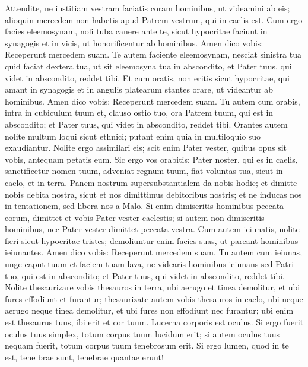 \begin{biblechapter}
\begin{biblechapter}
\begin{biblechapter}
\begin{biblechapter}
\begin{biblechapter}
\begin{biblechapter}
\verse Attendite, ne iustitiam vestram faciatis coram hominibus, ut videamini ab eis; alioquin mercedem non habetis apud Patrem vestrum, qui in caelis est. 
 \verse Cum ergo facies eleemosynam, noli tuba canere ante te, sicut hypocritae faciunt in synagogis et in vicis, ut honorificentur ab hominibus. Amen dico vobis: Receperunt mercedem suam.
 \verse Te autem faciente eleemosynam, nesciat sinistra tua quid faciat dextera tua, 
 \verse ut sit eleemosyna tua in abscondito, et Pater tuus, qui videt in abscondito, reddet tibi.
 \verse Et cum oratis, non eritis sicut hypocritae, qui amant in synagogis et in angulis platearum stantes orare, ut videantur ab hominibus. Amen dico vobis: Receperunt mercedem suam. 
\verse Tu autem cum orabis, intra in cubiculum tuum et, clauso ostio tuo, ora Patrem tuum, qui est in abscondito; et Pater tuus, qui videt in abscondito, reddet tibi. 
\verse Orantes autem nolite multum loqui sicut ethnici; putant enim quia in multiloquio suo exaudiantur. 
\verse Nolite ergo assimilari eis; scit enim Pater vester, quibus opus sit vobis, antequam petatis eum.
 \verse Sic ergo vos orabitis:
 Pater noster, qui es in caelis,
 sanctificetur nomen tuum,
 \verse adveniat regnum tuum,
 fiat voluntas tua,
 sicut in caelo, et in terra.
 \verse Panem nostrum supersubstantialem da nobis hodie;
 \verse et dimitte nobis debita nostra,
 sicut et nos dimittimus debitoribus nostris;
 \verse et ne inducas nos in tentationem,
 sed libera nos a Malo.
 \verse Si enim dimiseritis hominibus peccata eorum, dimittet et vobis Pater vester caelestis; 
\verse si autem non dimiseritis hominibus, nec Pater vester dimittet peccata vestra.
 \verse Cum autem ieiunatis, nolite fieri sicut hypocritae tristes; demoliuntur enim facies suas, ut pareant hominibus ieiunantes. Amen dico vobis: Receperunt mercedem suam. 
\verse Tu autem cum ieiunas, unge caput tuum et faciem tuam lava, 
 \verse ne videaris hominibus ieiunans sed Patri tuo, qui est in abscondito; et Pater tuus, qui videt in abscondito, reddet tibi.
 \verse Nolite thesaurizare vobis thesauros in terra, ubi aerugo et tinea demolitur, et ubi fures effodiunt et furantur; 
\verse thesaurizate autem vobis thesauros in caelo, ubi neque aerugo neque tinea demolitur, et ubi fures non effodiunt nec furantur; 
\verse ubi enim est thesaurus tuus, ibi erit et cor tuum.
 \verse Lucerna corporis est oculus. Si ergo fuerit oculus tuus simplex, totum corpus tuum lucidum erit; 
\verse si autem oculus tuus nequam fuerit, totum corpus tuum tenebrosum erit. Si ergo lumen, quod in te est, tene brae sunt, tenebrae quantae erunt! 

\end{biblechapter}
\end{biblechapter}
\end{biblechapter}
\end{biblechapter}
\end{biblechapter}
\end{biblechapter}
